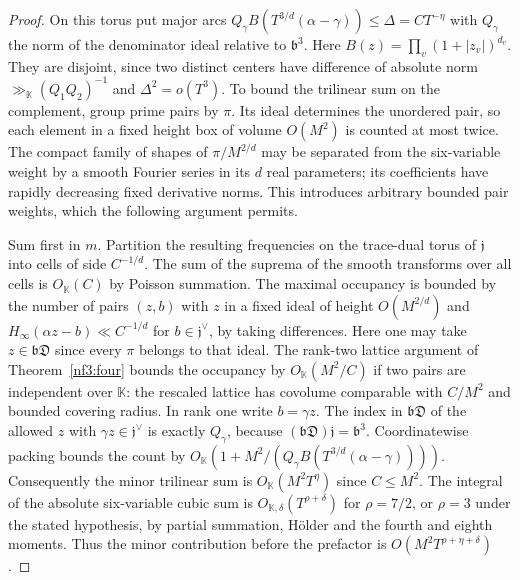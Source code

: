 \documentclass[11pt,letterpaper]{article}
\theoremstyle{definition}
\numberwithin{equation}{section}
\begin{document}
\begin{proof}
On this torus put major arcs
$Q_\gamma B(T^{3/d}(\alpha-\gamma))\le\Delta=C T^{-\eta}$ with
$Q_\gamma$ the norm of the denominator ideal relative to
$\mathfrak b^3$. Here $B(z)=\prod_v(1+|z_v|)^{d_v}$.
They are disjoint, since two distinct centers have difference of
absolute norm $\gg_{\mathbb K}(Q_1Q_2)^{-1}$ and
$\Delta^2=o(T^3)$. To bound the trilinear sum on the complement,
group prime pairs by $\pi$. Its ideal determines the unordered
pair, so each element in a fixed height box of volume $O(M^2)$ is
counted at most twice. The compact family of shapes of $\pi/M^{2/d}$
may be separated from the six-variable weight by a smooth Fourier
series in its $d$ real parameters; its coefficients have rapidly
decreasing fixed derivative norms. This introduces arbitrary
bounded pair weights, which the following argument permits.

Sum first in $m$. Partition the resulting frequencies on the
trace-dual torus of $\mathfrak j$ into cells of side $C^{-1/d}$.
The sum of the suprema of the smooth transforms over all cells
is $O_{\mathbb K}(C)$ by Poisson summation. The maximal occupancy
is bounded by the number of pairs $(z,b)$ with $z$ in a fixed
ideal of height $O(M^{2/d})$ and
$H_\infty(\alpha z-b)\ll C^{-1/d}$ for $b\in\mathfrak j^\vee$,
by taking differences. Here one may take
$z\in\mathfrak b\mathfrak D$ since every $\pi$ belongs to that
ideal. The rank-two lattice argument of
Theorem~\ref{nf3:four} bounds the occupancy by $O_{\mathbb K}(M^2/C)$
if two pairs are independent over $\mathbb K$: the rescaled
lattice has covolume comparable with $C/M^2$ and bounded covering
radius. In rank one write $b=\gamma z$. The index in
$\mathfrak b\mathfrak D$ of the allowed $z$ with
$\gamma z\in\mathfrak j^\vee$ is exactly $Q_\gamma$, because
$(\mathfrak b\mathfrak D)\mathfrak j=\mathfrak b^3$.
Coordinatewise packing bounds the count by
$O_{\mathbb K}(1+M^2/(Q_\gamma
B(T^{3/d}(\alpha-\gamma))))$. Consequently the minor trilinear
sum is $O_{\mathbb K}(M^2 T^\eta)$ since $C\le M^2$.
The integral of the absolute six-variable cubic sum is
$O_{\mathbb K,\delta}(T^{\rho+\delta})$ for $\rho=7/2$,
or $\rho=3$ under the stated hypothesis, by partial summation,
H\"older and the fourth and eighth moments. Thus the minor
contribution before the prefactor is $O(M^2 T^{\rho+\eta+\delta})$.


\end{proof}
\end{document}
